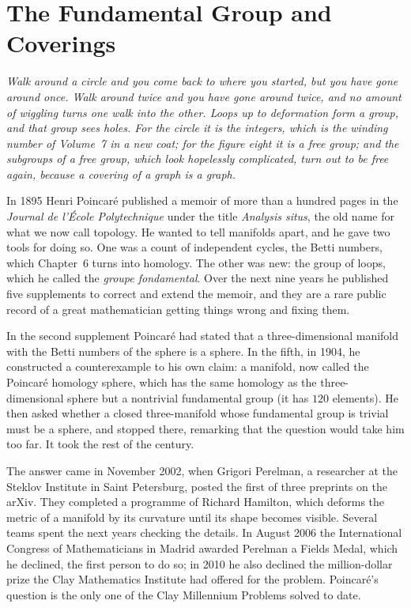 \chapter{The Fundamental Group and Coverings}

\begin{center}\itshape
Walk around a circle and you come back to where you started, but you have gone around once. Walk around twice and you have gone around twice, and no
amount of wiggling turns one walk into the other. Loops up to deformation form a group, and that group sees holes. For the circle it is the integers,
which is the winding number of Volume~7 in a new coat; for the figure eight it is a free group; and the subgroups of a free group, which look
hopelessly complicated, turn out to be free again, because a covering of a graph is a graph.
\end{center}

In 1895 Henri Poincar\'e published a memoir of more than a hundred pages in the \emph{Journal de l'\'Ecole Polytechnique} under the title
\emph{Analysis situs}, the old name for what we now call topology. He wanted to tell manifolds apart, and he gave two tools for doing so. One was a
count of independent cycles, the Betti numbers, which Chapter~6 turns into homology. The other was new: the group of loops, which he called the
\emph{groupe fondamental}. Over the next nine years he published five supplements to correct and extend the memoir, and they are a rare public record of
a great mathematician getting things wrong and fixing them.

In the second supplement Poincar\'e had stated that a three-dimensional manifold with the Betti numbers of the sphere is a sphere. In the fifth, in
1904, he constructed a counterexample to his own claim: a manifold, now called the Poincar\'e homology sphere, which has the same homology as the
three-dimensional sphere but a nontrivial fundamental group (it has $120$ elements). He then asked whether a closed three-manifold whose fundamental group is
trivial must be a sphere, and stopped there, remarking that the question would take him too far. It took the rest of the century.

The answer came in November 2002, when Grigori Perelman, a researcher at the Steklov Institute in Saint Petersburg, posted the first of three preprints on
the arXiv. They completed a programme of Richard Hamilton, which deforms the metric of a manifold by its curvature until its shape becomes visible. Several
teams spent the next years checking the details. In August 2006 the International Congress of Mathematicians in Madrid awarded Perelman a Fields Medal,
which he declined, the first person to do so; in 2010 he also declined the million-dollar prize the Clay Mathematics Institute had offered for the
problem. Poincar\'e's question is the only one of the Clay Millennium Problems solved to date.

